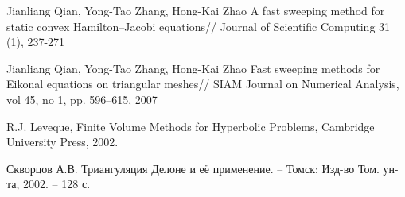 \begin{thebibliography}{99}
 {Jianliang Qian, Yong-Tao Zhang, Hong-Kai Zhao} A
  fast sweeping method for static convex Hamilton–Jacobi equations//
  Journal of Scientific Computing 31 (1), 237-271
  
 {Jianliang Qian, Yong-Tao Zhang, Hong-Kai Zhao} Fast
  sweeping methods for Eikonal equations on triangular meshes// SIAM
  Journal on Numerical Analysis, vol 45, no 1, pp. 596–615, 2007
  

 {R.J. Leveque}, Finite Volume Methods for Hyperbolic Problems, Cambridge
University Press, 2002.

 {Скворцов А.В.} Триангуляция Делоне и её применение. –
  Томск: Изд-во Том. ун-та, 2002. – 128 с.


  
\end{thebibliography}


